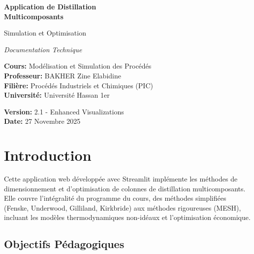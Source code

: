 \documentclass[11pt,a4paper]{article}
\begin{document}
\begin{titlepage}
    \centering
    \vspace*{2cm}

    {\Huge\bfseries Application de Distillation\\Multicomposants\par}
    \vspace{1cm}
    {\Large Simulation et Optimisation\par}
    \vspace{2cm}

    {\Large\itshape Documentation Technique\par}
    \vspace{3cm}

    {\large
    \textbf{Cours:} Modélisation et Simulation des Procédés\\
    \textbf{Professeur:} BAKHER Zine Elabidine\\
    \textbf{Filière:} Procédés Industriels et Chimiques (PIC)\\
    \textbf{Université:} Université Hassan 1er\\
    \vspace{1cm}

    \textbf{Version:} 2.1 - Enhanced Visualizations\\
    \textbf{Date:} 27 Novembre 2025\par}

    \vfill
\end{titlepage}

\tableofcontents
\newpage

\section{Introduction}

Cette application web développée avec Streamlit implémente les méthodes de dimensionnement et d'optimisation de colonnes de distillation multicomposants. Elle couvre l'intégralité du programme du cours, des méthodes simplifiées (Fenske, Underwood, Gilliland, Kirkbride) aux méthodes rigoureuses (MESH), incluant les modèles thermodynamiques non-idéaux et l'optimisation économique.

\subsection{Objectifs Pédagogiques}
\end{document}
